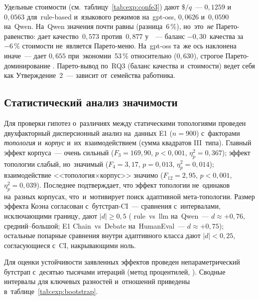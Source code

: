 Удельные стоимости (см.~таблицу~\ref{tab:exp:confe3}) дают
$\$/q$~--- $0{,}1259$ и~$0{,}0563$ для~rule-based и~языкового режимов
на~gpt-oss, $0{,}0626$ и~$0{,}0590$ на~Qwen. На~Qwen значения почти
равны (разница~6\,\%), но~это~\emph{не} Парето-равенство: 
дает качество~$0{,}573$ против~$0{,}877$ у~~--- баланс
$-0{,}30$~качества за~$-6\,\%$ стоимости не~является Парето-меню.
На~gpt-oss та~же ось наклонена иначе~---  дает $0{,}655$
при~экономии~53\,\% относительно  ($0{,}630$),
строгое Парето-доминирование . Парето-вывод по~RQ3 (баланс
качества и~стоимости) ведет себя как Утверждение~2~--- зависит от~семейства работника.

\subsection{Статистический анализ значимости}
\label{sec:exp:bootstrap}

Для проверки гипотез о~различиях между статическими топологиями
проведен двухфакторный дисперсионный анализ на~данных E1 ($n=900$)
с~факторами \emph{топология} и~\emph{корпус} и~их~взаимодействием
(сумма квадратов III~типа). Главный эффект корпуса~--- очень сильный
($F_{3}=169{,}90$, $p<0{,}001$, $\eta^2_p=0{,}367$); эффект топологии
слабый, но~значимый ($F_{4}=3{,}17$, $p=0{,}013$, $\eta^2_p=0{,}014$);
взаимодействие <<топология$\times$корпус>> значимо ($F_{12}=2{,}95$,
$p<0{,}001$, $\eta^2_p=0{,}039$). Последнее подтверждает, что эффект
топологии не~одинаков на~разных корпусах, что~и~мотивирует поиск
адаптивной мета-топологии. Размер эффекта Коэна согласован с~бутстрап-CI~---
сравнения с~интервалами, исключающими границу, дают $|d|\ge0{,}5$
( rule~vs~llm на~Qwen~--- $d\approx+0{,}76$, средний--большой;
E1 Chain~vs~Debate на~HumanEval~--- $d\approx+0{,}75$); остальные
попарные сравнения внутри адаптивного класса дают $|d|<0{,}25$,
согласующиеся с~CI, накрывающими ноль.

Для оценки устойчивости заявленных эффектов проведен
непараметрический бутстрап с~десятью тысячами итераций (метод
процентилей, ). Сводные интервалы для ключевых
разностей и~отношений приведены в~таблице~\ref{tab:exp:bootstrap}.

